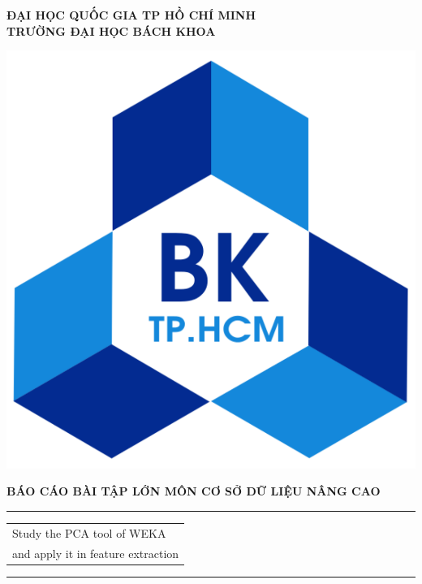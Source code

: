 \documentclass{hcmutarticle}
\begin{document}
\thispagestyle{empty}
\begin{center}
\LARGE\bfseries ĐẠI HỌC QUỐC GIA TP HỒ CHÍ MINH \\
TRƯỜNG ĐẠI HỌC BÁCH KHOA
\end{center}

\begin{center}
\includegraphics[scale=0.2]{hcmut.pdf}\\[1cm]
\end{center}

\vspace{1cm}

\begin{center}
\Large \bfseries BÁO CÁO BÀI TẬP LỚN MÔN CƠ SỞ DỮ LIỆU NÂNG CAO\\[0.5cm]
\end{center}
\rule{\textwidth}{1pt}
\vspace{2pt}
\begin{center}
\Huge
\begin{tabular}{@{}l}
Study the PCA tool of WEKA \\
and apply it in feature extraction\\[6pt]
\end{tabular}
\end{center}
\rule{\textwidth}{1pt}\\[1cm]
\end{document}
